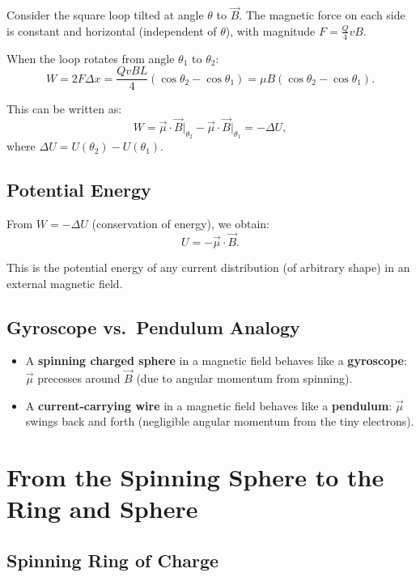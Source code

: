 \documentclass[11pt,a4paper]{article}
\theoremstyle{definition}
\theoremstyle{plain}
\theoremstyle{remark}
\begin{document}
Consider the square loop tilted at angle $\theta$ to $\vec{B}$. The magnetic force on each side is constant and horizontal (independent of $\theta$), with magnitude $F = \frac{Q}{4}vB$.

When the loop rotates from angle $\theta_1$ to $\theta_2$:
\[
    W = 2F\Delta x = \frac{QvBL}{4}(\cos\theta_2 - \cos\theta_1) = \mu B(\cos\theta_2 - \cos\theta_1).
\]

This can be written as:
\[
    W = \vec{\mu}\cdot\vec{B}\big|_{\theta_2} - \vec{\mu}\cdot\vec{B}\big|_{\theta_1} = -\Delta U,
\]
where $\Delta U = U(\theta_2) - U(\theta_1)$.

\subsection{Potential Energy}

From $W = -\Delta U$ (conservation of energy), we obtain:
\[
    \boxed{U = -\vec{\mu}\cdot\vec{B}.}
\]

This is the potential energy of any current distribution (of arbitrary shape) in an external magnetic field.

\subsection{Gyroscope vs.\ Pendulum Analogy}

\begin{itemize}
    \item A \textbf{spinning charged sphere} in a magnetic field behaves like a \textbf{gyroscope}: $\vec{\mu}$ precesses around $\vec{B}$ (due to angular momentum from spinning).
    \item A \textbf{current-carrying wire} in a magnetic field behaves like a \textbf{pendulum}: $\vec{\mu}$ swings back and forth (negligible angular momentum from the tiny electrons).
\end{itemize}

\section{From the Spinning Sphere to the Ring and Sphere}

\subsection{Spinning Ring of Charge}
\end{document}
